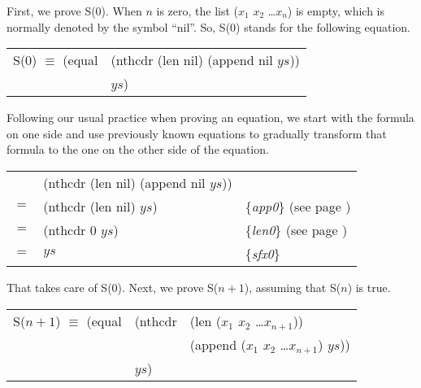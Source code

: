 First, we prove S(0). When $n$ is zero, the list ($x_1$ $x_2$ \dots $x_n$) is empty, which is normally denoted by the symbol ``nil''. So, S(0) stands for the following equation.

\begin{center}
\begin{tabular}{ll}
S(0) $\equiv$ (equal & (nthcdr (len nil) (append nil $ys$)) \\
                     & $ys$)                                \\
\end{tabular}
\end{center}

Following our usual practice when proving an equation, we start with the formula on one side and use previously known equations to gradually transform that formula to the one on the other side of the equation.

\begin{center}
\begin{tabular}{lll}
    & (nthcdr (len nil) (append nil $ys$))  &                                                      \\
$=$ & (nthcdr (len nil) $ys$)               & \{\emph{app0}\} (see page \pageref{append-equations})\\
$=$ & (nthcdr 0 $ys$)                       & \{\emph{len0}\} (see page \pageref{len-equations})   \\
$=$ & $ys$                                  & \{\emph{sfx0}\}                                      \\
\end{tabular}
\end{center}

That takes care of S(0). Next, we prove S($n+1$), assuming that S($n$) is true.

\begin{center}
\begin{tabular}{lll}
S($n+1$) $\equiv$ (equal & (nthcdr & (len ($x_1$ $x_2$ \dots $x_{n+1}$))          \\
                         &         & (append ($x_1$ $x_2$ \dots $x_{n+1}$) $ys$)) \\
                         & $ys$)   &                                              \\
\end{tabular}
\end{center}

